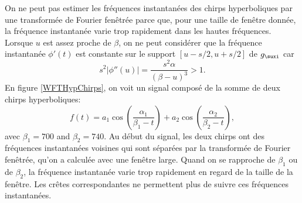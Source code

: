 \begin{Examples}
On ne peut pas estimer les fr\'{e}quences instantan\'{e}es des chirps 
hyperboliques par une transform\'{e}e de Fourier fen\^{e}tr\'{e}e 
parce que, pour une taille de fen\^{e}tre donn\'{e}e, la fr\'{e}quence 
instantan\'{e}e varie trop rapidement dans les hautes fr\'{e}quences. 
Lorsque $u$ est assez proche de $\beta$, on ne peut consid\'erer
que la fr\'equence instantan\'ee $\phi'(t)$ est constante sur
le support $[u-s/2,u+s/2]$ de $g_\suxi$ car
\[
s^2 |\phi '' (u)| = 
\frac {s^2 \alpha} {(\beta - u)^3} > 1 .
\]
En figure \ref{WFTHypChirps}, on voit un signal compos\'{e} de la 
somme de deux chirps hyperboliques:
\begin{equation}
\label{ParallHypCh}
f(t) = a_1 \cos \left(\frac {\alpha_1} {\beta_1 - t}\right) +
a_2 \cos \left(\frac {\alpha_2} {\beta_2 - t}\right),
\end{equation}
avec $\beta_1 = 700$	and	$\beta_2 = 740$.
Au d\'{e}but du signal, les deux chirps ont des fr\'{e}quences 
instantan\'{e}es voisines qui sont s\'{e}par\'{e}es par la 
transform\'{e}e de Fourier fen\^{e}tr\'{e}e, qu'on a calcul\'{e}e 
avec une fen\^{e}tre large. Quand on se rapproche de $\beta_1$ ou de 
$\beta_2$, la fr\'{e}quence instantan\'{e}e varie trop rapidement en 
regard de la taille de la fen\^{e}tre. Les cr\^{e}tes correspondantes 
ne permettent plus de suivre ces fr\'{e}quences instantan\'{e}es. 
\end{Examples}



